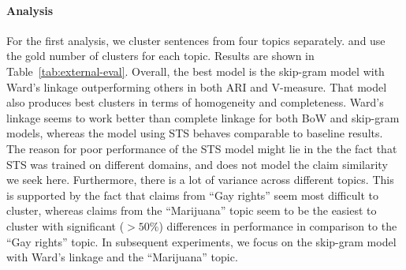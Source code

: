 \paragraph{Analysis } 
For the first analysis, we cluster sentences from four topics separately. 
and use the gold number of clusters for each topic. 
Results are shown in Table~\ref{tab:external-eval}. 
Overall, the best model is the skip-gram model with Ward's linkage 
outperforming others in both ARI and V-measure. 
That model also produces best clusters in terms of homogeneity and 
completeness. 
Ward's linkage seems to work better than complete linkage for both BoW and
skip-gram models, whereas the model using STS behaves comparable to baseline results. 
The reason for poor performance of the STS model might lie in the
the fact that STS was trained 
on different domains, and does not model the claim similarity we seek here.  
Furthermore, there is a lot of variance across different topics. 
This is supported by the fact that claims from ``Gay rights'' seem most
difficult to cluster, whereas claims from the 
``Marijuana'' topic seem to be the easiest to cluster with significant ($>50\%$) differences
in performance in comparison to the ``Gay rights'' topic.
In subsequent experiments, we focus on the skip-gram model 
with Ward's linkage and the ``Marijuana'' topic. 

